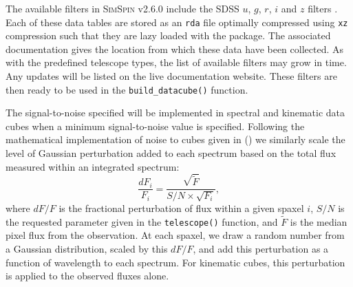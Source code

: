 \documentclass[
  journal=pasa,
  manuscript=research-paper, %
  year=2020,
  volume=37,
]{cup-journal}
\newcommand{\simspin}[1]{\textsc{SimSpin}#1} %
\newcommand{\ssversion}[1]{v2.6.0#1}
\newcommand{\citetoggle}[1]{\citeauthor{#1} (\citeyear{#1})}
\newcommand{\telescope}[1]{\texttt{telescope()}#1}
\newcommand{\builddatacube}[1]{\texttt{build\_datacube()}#1}
\begin{document}
The available filters in \simspin{} \ssversion{} include the SDSS $u$, $g$, $r$, $i$ and $z$ filters \citep{Fukugita1996SDSSFilters, Doi2010PhotometricImager}. 
Each of these data tables are stored as an \texttt{rda} file optimally compressed using \texttt{xz} compression such that they are lazy loaded with the package. 
The associated documentation gives the location from which these data have been collected. 
As with the predefined telescope types, the list of available filters may grow in time.
Any updates will be listed on the live documentation website. 
These filters are then ready to be used in the \builddatacube{} function.


The signal-to-noise specified will be implemented in spectral and kinematic data cubes when a minimum signal-to-noise value is specified. 
Following the mathematical implementation of noise to cubes given in \citetoggle{Nanni2022iMaNGAcubes} we similarly scale the level of Gaussian perturbation added to each spectrum based on the total flux measured within an integrated spectrum:
\begin{equation}
    \frac{dF_i}{F_i} = \frac{\sqrt{\tilde{F}}}{S/N \times \sqrt{F_i}},
\end{equation}
where $dF/F$ is the fractional perturbation of flux within a given spaxel $i$, $S/N$ is the requested parameter given in the \telescope{} function, and $\tilde{F}$ is the median pixel flux from the observation. 
At each spaxel, we draw a random number from a Gaussian distribution, scaled by this $dF/F$, and add this perturbation as a function of wavelength to each spectrum. 
For kinematic cubes, this perturbation is applied to the observed fluxes alone. 
\end{document}
